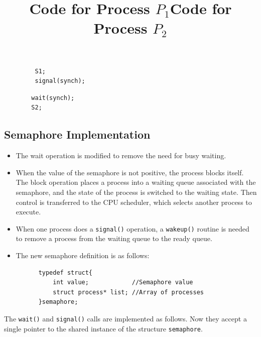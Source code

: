 \documentclass{article}
\theoremstyle{plain}
\theoremstyle{definition}
\begin{document}
\begin{figure}[!ht]
 \begin{minipage}{0.4\textwidth}
  \centering
  \begin{verbatim}
   S1;
   signal(synch);
  \end{verbatim}
  \title{Code for Process $P_1$}
 \end{minipage}
 \begin{minipage}{0.4\textwidth}
  \centering
  \begin{verbatim}
  wait(synch);
  S2;
  \end{verbatim}
  \title{Code for Process $P_2$}
 \end{minipage}
\end{figure}

\subsection{Semaphore Implementation}
\begin{itemize}
    \item The wait operation is modified to remove the need for busy waiting. 
    
    \item When the value of the semaphore is not positive, the process blocks itself. The block operation places a process into a waiting queue associated with the semaphore, and the state of the process is switched to the waiting state. Then control is transferred to the CPU scheduler, which selects another process to execute.
    
    \item When one process does a \texttt{signal()} operation, a \texttt{wakeup()} routine is needed to remove a process from the waiting queue to the ready queue. 
    
    \item The new semaphore definition is as follows:
\end{itemize}

\begin{figure}[!h]
\begin{verbatim}
    typedef struct{
        int value;            //Semaphore value
        struct process* list; //Array of processes
    }semaphore;
\end{verbatim}
\end{figure}

The \texttt{wait()} and \texttt{signal()} calls are implemented as follows. Now they accept a single pointer to the shared instance of the structure \texttt{semaphore}.
\end{document}
